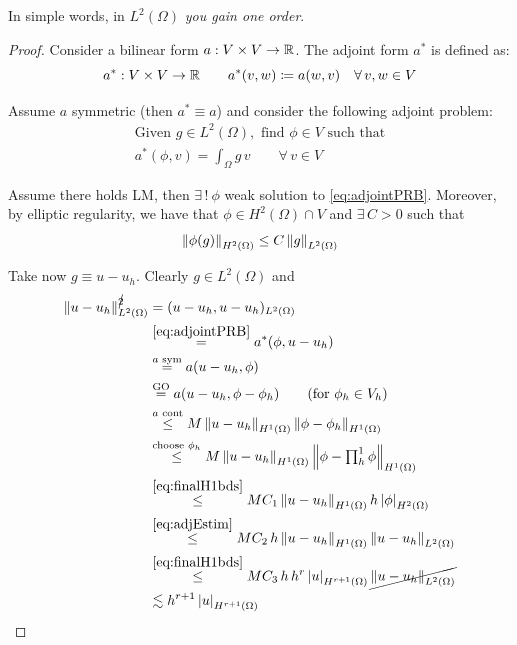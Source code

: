 In simple words, in $L^2(\Omega)$ \emph{you gain one order}.

\begin{proof}
Consider a bilinear form $a:V\times V\to\mathbb{R}$. The adjoint form $a^*$ is defined as:
\begin{equation*}
a^*:V\times V\to\mathbb{R} \qquad a^*(v,w)\coloneq a(w,v)\quad\forall\,v,w\in V
\end{equation*}

Assume $a$ symmetric (then $a^*\equiv a$) and consider the following adjoint problem:
\begin{equation}
\label{eq:adjointPRB}
\begin{gathered}
\text{Given }g\in L^2(\Omega), \text{ find }\phi\in V\text{ such that}\\
a^*(\phi,v)=\int_\Omega g\,v\qquad\forall\,v\in V
\end{gathered}
\end{equation}

Assume there holds LM, then $\exists\,!\  \phi$ weak solution to \eqref{eq:adjointPRB}. Moreover, by elliptic regularity, we have that $\phi\in H^2(\Omega)\cap V$ and $\exists\, C>0$ such that
\begin{equation}
\label{eq:adjEstim}
\left\lVert \phi(g) \right\rVert_{H^2(\Omega)}\leq C \left\lVert g \right\rVert_{L^2(\Omega)}
\end{equation}

Take now $g\equiv u-u_h$. Clearly $g\in L^2(\Omega)$ and
\begin{equation*}
\begin{aligned}
\left\lVert u-u_h \right\rVert_{L^2(\Omega)}^{\cancel{2}} & = (u-u_h,u-u_h)_{L^2(\Omega)} \\
&\overset{\eqref{eq:adjointPRB}}{=} a^* (\phi,u-u_h) \\
&\overset{a\text{ sym}}{=}a(u-u_h,\phi) \\
&\overset{\text{GO}}{=}a(u-u_h,\phi-\phi_h) \qquad (\text{for }\phi_h\in V_h) \\
&\overset{a\text{ cont}}{\leq} M \left\lVert u-u_h \right\rVert_{H^1(\Omega)}\left\lVert \phi-\phi_h \right\rVert_{H^1(\Omega)} \\
&\overset{\text{choose }\phi_h}{\leq} M \left\lVert u-u_h \right\rVert_{H^1(\Omega)}\left\lVert \phi-\textstyle\prod_h^1\phi \right\rVert_{H^1(\Omega)} \\
&\overset{\eqref{eq:finalH1bds}}{\leq} MC_1 \left\lVert u-u_h \right\rVert_{H^1(\Omega)} h\left\lvert \phi \right\rvert_{H^2(\Omega)} \\
&\overset{\eqref{eq:adjEstim}}{\leq} MC_2\, h \left\lVert u-u_h \right\rVert_{H^1(\Omega)} \left\lVert u-u_h \right\rVert_{L^2(\Omega)} \\
&\overset{\eqref{eq:finalH1bds}}{\leq} MC_3\, h\, h^r\left\lvert u \right\rvert_{H^{r+1}(\Omega)} \cancel{\left\lVert u-u_h \right\rVert_{L^2(\Omega)}} \\
&\lesssim h^{r+1} \left\lvert u \right\rvert_{H^{r+1}(\Omega)} 
\end{aligned}
\end{equation*}
\end{proof}

